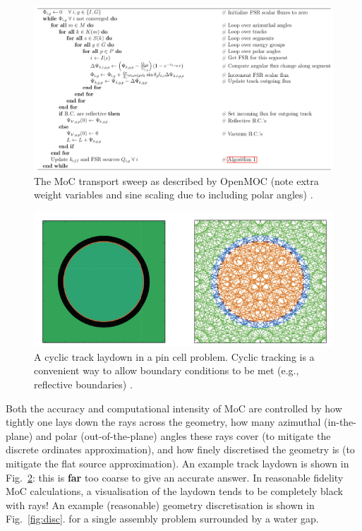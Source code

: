 \documentclass{article}
\begin{document}
\begin{figure}[h]
    \centering
    \includegraphics[width=0.9\linewidth]{sweep.png}
    \caption{The MoC transport sweep as described by OpenMOC (note extra weight variables and sine scaling due to including polar angles) \cite{openmoc}.}
    \label{fig:sweep}
\end{figure}

\begin{figure}[h]
    \centering
    \includegraphics[width=0.9\linewidth]{cyclic.png}
    \caption{A cyclic track laydown in a pin cell problem. Cyclic tracking is a convenient way to allow boundary conditions to be met (e.g., reflective boundaries) \cite{Tramm2017}.}
    \label{fig:laydown}
\end{figure}

Both the accuracy and computational intensity of MoC are controlled by how tightly one lays down the rays across the geometry, how many azimuthal (in-the-plane) and polar (out-of-the-plane) angles these rays cover (to mitigate the discrete ordinates approximation), and how finely discretised the geometry is (to mitigate the flat source approximation). An example track laydown is shown in Fig.~\ref{fig:laydown}: this is \textbf{far} too coarse to give an accurate answer. In reasonable fidelity MoC calculations, a visualisation of the laydown tends to be completely black with rays! An example (reasonable) geometry discretisation is shown in Fig.~\ref{fig:disc}. for a single assembly problem surrounded by a water gap.
\end{document}
